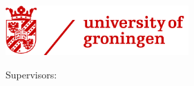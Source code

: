 \begin{titlepage}
    \begin{center}
        \large

        \hfill
        
        \vfill

        \begingroup
            \color{Maroon}\spacedallcaps{\myTitle} \\ \bigskip
        \endgroup
		
		\vfill
		
		\spacedlowsmallcaps{\myName} \\
		\myDegree \\
		
		\vfill
		
		\includegraphics[width=7cm]{gfx/RUG_logo.png} \\
		
		\medskip
		
		Supervisors: \\
		\myProf \\
		\myOtherProf
		
		\vfill
		\vfill
		
        \mySubtitle \\ \medskip
        
        \myDepartment \\
        \myFaculty \\

		\medskip
		
        \myTime

        \vfill

    \end{center}
\end{titlepage}
